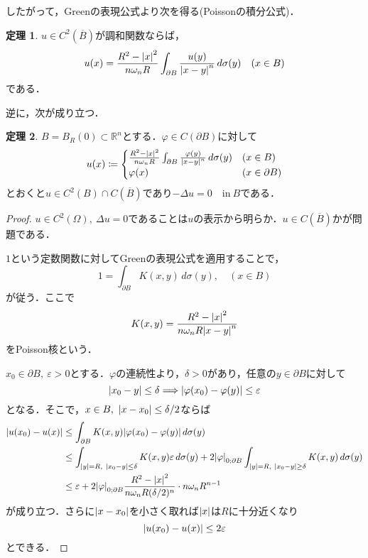 \documentclass[a4paper]{ltjsarticle}
\newcommand{\Rset}{\mathbb{R}}
\newcommand{\Om}{\Omega}
\newcommand{\inn}{\quad\text{in}\ }
\newcommand{\1}{\mathbbm{1}}
\numberwithin{equation}{section}
\theoremstyle{definition}
\newtheorem{thm}{定理}[section]
\begin{document}
したがって，Greenの表現公式より次を得る(Poissonの積分公式)．
\begin{thm}
    $u\in C^2(\overline{B})$が調和関数ならば，
    \begin{equation}
        u(x)=\frac{R^2-\abs{x}^2}{n\omega_nR}\int_{\partial B}\frac{u(y)}{\abs{x-y}^n}\,d\sigma(y)\quad (x\in B)
    \end{equation}
    である．
\end{thm}
逆に，次が成り立つ．
\begin{thm}\label{thm:poisson_integral}
    $B=B_R(0)\subset\Rset^n$とする．$\varphi\in C(\partial B)$に対して
    \begin{equation}
        u(x)\coloneqq\begin{cases}
            \frac{R^2-\abs{x}^2}{n\omega_nR}\int_{\partial B}\frac{\varphi(y)}{\abs{x-y}^n}\,d\sigma(y) & (x\in B)\\
            \varphi(x) & (x\in \partial B)
        \end{cases}
    \end{equation}
    とおくと$u\in C^2(B)\cap C(\overline{B})$であり$-\Delta u=0\inn B$である．
\end{thm}
\begin{proof}
    $u\in C^2(\Om),\ \Delta u=0$であることは$u$の表示から明らか．$u\in C(\overline{B})$かが問題である．

    $1$という定数関数に対してGreenの表現公式を適用することで，
    \begin{equation}
        1=\int_{\partial B}K(x,y)\,d\sigma(y),\quad (x\in B)
    \end{equation}
    が従う．ここで 
    \begin{equation}
        K(x,y)=\frac{R^2-\abs{x}^2}{n\omega_nR\abs{x-y}^n}
    \end{equation}
    をPoisson核という．

    $x_0\in \partial B,\ \varepsilon>0$とする．$\varphi$の連続性より，$\delta>0$があり，任意の$y\in \partial B$に対して
    \begin{equation}
        \abs{x_0-y}\leq \delta\Longrightarrow \abs{\varphi(x_0)-\varphi(y)}\leq\varepsilon
    \end{equation}
    となる．そこで，$x\in B,\ \abs{x-x_0}\leq \delta/2$ならば
    \begin{align}
        \abs{u(x_0)-u(x)}&\leq \int_{\partial B}K(x,y)\abs{\varphi(x_0)-\varphi(y)}\,d\sigma(y)\\
        &\leq \int_{\abs{y}=R,\ \abs{x_0-y}\leq \delta}K(x,y)\varepsilon\,d\sigma(y)+2\abs{\varphi}_{0;\partial B}\int_{\abs{y}=R,\ \abs{x_0-y}\geq\delta}K(x,y)\,d\sigma(y)\\
        &\leq \varepsilon+2\abs{\varphi}_{0;\partial B}\frac{R^2-\abs{x}^2}{n\omega_nR(\delta/2)^n}\cdot n\omega_nR^{n-1}
    \end{align}
    が成り立つ．さらに$\abs{x-x_0}$を小さく取れば$\abs{x}$は$R$に十分近くなり
    \begin{equation}
        \abs{u(x_0)-u(x)}\leq 2\varepsilon  
    \end{equation}
    とできる．
\end{proof}
\end{document}
